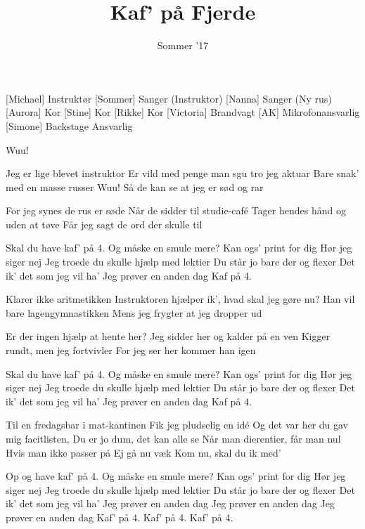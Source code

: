 \documentclass[a4paper,11pt]{article}
\title{Kaf' på Fjerde}
\author{Sommer '17}
\begin{document}
\maketitle

\begin{roles}
[Michael] Instruktør
[Sommer] Sanger (Instruktor)
[Nanna] Sanger (Ny rus)
[Aurora] Kor
[Stine] Kor
[Rikke] Kor
[Victoria] Brandvagt
[AK] Mikrofonansvarlig
[Simone] Backstage Ansvarlig
\end{roles}

\begin{song}
 Wuu!

 Jeg er lige blevet instruktor
Er vild med penge man sgu tro jeg aktuar
Bare snak' med en masse russer
Wuu!
Så de kan se at jeg er sød og rar

 For jeg synes de rus er søde
Når de sidder til studie-café
Tager hendes hånd og uden at tøve
Får jeg sagt de ord der skulle til

 Skal du have kaf' på 4.
Og måske en smule mere?
Kan ogs' print for dig
 Hør jeg siger nej
Jeg troede du skulle hjælp med lektier
Du står jo bare der og flexer
Det ik' det som jeg vil ha'
 Jeg prøver en anden dag
Kaf på 4.

 Klarer ikke aritmetikken
Instruktoren hjælper ik', hvad skal jeg gøre nu?
Han vil bare lagengymnastikken
Mens jeg frygter at jeg dropper ud

 Er der ingen hjælp at hente her?
Jeg sidder her og kalder på en ven
Kigger rundt, men jeg fortvivler
For jeg ser her kommer han igen

 Skal du have kaf' på 4.
Og måske en smule mere?
Kan ogs' print for dig
 Hør jeg siger nej
Jeg troede du skulle hjælp med lektier
Du står jo bare der og flexer
Det ik' det som jeg vil ha'
 Jeg prøver en anden dag
Kaf på 4.

 Til en fredagsbar i mat-kantinen
Fik jeg pludselig en idé
 Og det var her du gav mig facitlisten,
Du er jo dum, det kan alle se
 Når man dierentier, får man nul
Hvis man ikke passer på
 Ej gå nu væk
 Kom nu, skal du ik med'

 Op og have kaf' på 4.
Og måske en smule mere?
Kan ogs' print for dig
 Hør jeg siger nej
Jeg troede du skulle hjælp med lektier
Du står jo bare der og flexer
Det ik' det som jeg vil ha'
 Jeg prøver en anden dag
Jeg prøver en anden dag
Jeg prøver en anden dag
Kaf' på 4.
Kaf' på 4.
Kaf' på 4.
\end{song}
\end{document}
